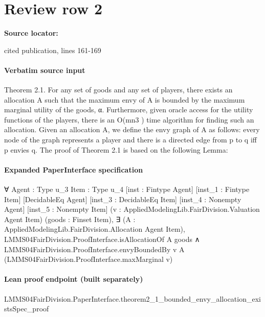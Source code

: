 \documentclass[10pt]{article}
\begin{document}
\section*{Review row 2}
\textbf{Source locator:} {\footnotesize\raggedright cited publication, lines 161-\allowbreak{}169\par}
\paragraph{Verbatim source input}
\begin{ReviewVerbatim}
Theorem 2.1. For any set of goods and any set of players, there exists an allocation A such that the maximum envy
of A is bounded by the maximum marginal utility of the
goods, α. Furthermore, given oracle access for the utility
functions of the players, there is an O(mn3 ) time algorithm
for finding such an allocation.
Given an allocation A, we define the envy graph of A as
follows: every node of the graph represents a player and
there is a directed edge from p to q iff p envies q. The proof
of Theorem 2.1 is based on the following Lemma:
\end{ReviewVerbatim}



\paragraph{Expanded PaperInterface specification}
\begin{ReviewVerbatim}
∀ {Agent : Type u_3} {Item : Type u_4} [inst : Fintype Agent] [inst_1 : Fintype Item] [DecidableEq Agent]
  [inst_3 : DecidableEq Item] [inst_4 : Nonempty Agent] [inst_5 : Nonempty Item]
  (v : AppliedModelingLib.FairDivision.Valuation Agent Item) (goods : Finset Item),
  ∃ (A : AppliedModelingLib.FairDivision.Allocation Agent Item),
    LMMS04FairDivision.ProofInterface.isAllocationOf A goods ∧
      LMMS04FairDivision.ProofInterface.envyBoundedBy v A (LMMS04FairDivision.ProofInterface.maxMarginal v)
\end{ReviewVerbatim}



\paragraph{Lean proof endpoint (built separately)}\begin{ReviewVerbatim}
LMMS04FairDivision.PaperInterface.theorem2_1_bounded_envy_allocation_existsSpec_proof
\end{ReviewVerbatim}
\end{document}
